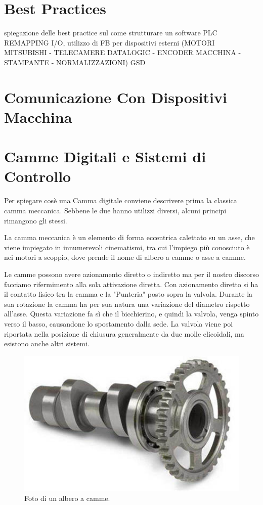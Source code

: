 \documentclass[12pt, a4paper, oneside]{book}
\begin{document}
\section{Best Practices}
spiegazione delle best practice sul come strutturare un software PLC REMAPPING I/O, utilizzo di FB per dispositivi esterni (MOTORI MITSUBISHI - TELECAMERE DATALOGIC - ENCODER MACCHINA - STAMPANTE - NORMALIZZAZIONI) GSD
\section{Comunicazione Con Dispositivi Macchina}

\section{Camme Digitali e Sistemi di Controllo}
Per spiegare cosè una Camma digitale conviene descrivere prima la classica camma meccanica. Sebbene le due hanno utilizzi diversi, alcuni principi rimangono gli stessi.

La camma meccanica è un elemento di forma eccentrica calettato su un asse, che viene impiegato in innumerevoli cinematismi, tra cui l'impiego più conosciuto è nei motori a scoppio, dove prende il nome di albero a camme o asse a camme.

Le camme possono avere azionamento diretto o indiretto ma per il nostro discorso facciamo rifermimento alla sola attivazione diretta.
Con azionamento diretto si ha il contatto fisico tra la camma e la "Punteria" posto sopra la valvola. Durante la sua rotazione la camma ha per sua natura una variazione del diametro rispetto all'asse. Questa variazione fa sì che il bicchierino, e quindi la valvola, venga spinto verso il basso, causandone lo spostamento dalla sede. La valvola viene poi riportata nella posizione di chiusura generalmente da due molle elicoidali, ma esistono anche altri sistemi.

\begin{figure}[H]
	\centering
	\includegraphics[width=12cm]{Immagini/camme}
	\caption{ Foto di un albero a camme.}
\end{figure}
\end{document}
